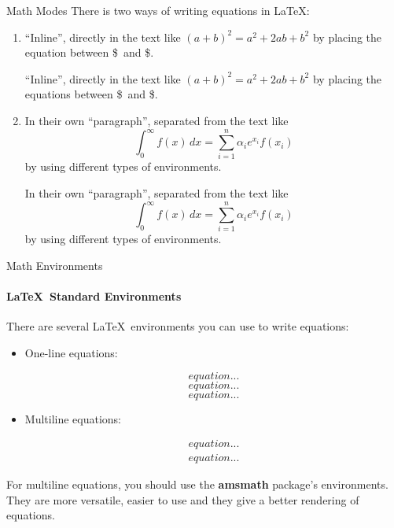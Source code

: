 \begin{frame}[fragile]{Math Modes}
	There is two ways of writing equations in \LaTeX:
	
	\begin{enumerate}
		\item ``Inline'', directly in the text like $(a + b)^2 = a^2 + 2ab + b^2$ by placing the equation between \$\ and \$.
\begin{codesource}
	``Inline'', directly in the text like $(a + b)^2 = a^2 + 2ab + b^2$ by placing 
	the equations between \$\ and \$.
\end{codesource}
		\item In their own ``paragraph'', separated from the text like
			\begin{equation*}
				\int_0^\infty f(x)\, dx =
				\sum_{i = 1}^n \alpha_i e^{x_i} f(x_i)
			\end{equation*}
			by using different types of environments.
\begin{codesource}
	In their own ``paragraph'', separated from the text like
	\begin{equation*}
		\int_0^\infty f(x)\, dx =
		\sum_{i = 1}^n \alpha_i e^{x_i} f(x_i)
	\end{equation*}
	by using different types of environments.
\end{codesource}
	\end{enumerate}
\end{frame}


\begin{frame}[fragile,c]{Math Environments}
	\framesubtitle{\LaTeX\ Standard Environments}
	There are several \LaTeX\ environments you can use to write equations:
	\begin{itemize}
		\item One-line equations:
\begin{codesource}
	\begin{displaymath} equation...	\end{displaymath}
	\begin{equation} equation... \end{equation}
	\begin{equation*} equation... \end{equation*}
\end{codesource}
		\item Multiline equations:
\begin{codesource}
	\begin{eqnarray} equation...  \end{eqnarray}
	\begin{eqnarray*} equation... \end{eqnarray*}
\end{codesource}
	\end{itemize}

	\pause
	For multiline equations, you should use the \textbf{amsmath} package's environments. They are more versatile, easier to use and they give a better rendering of equations.
\end{frame}

